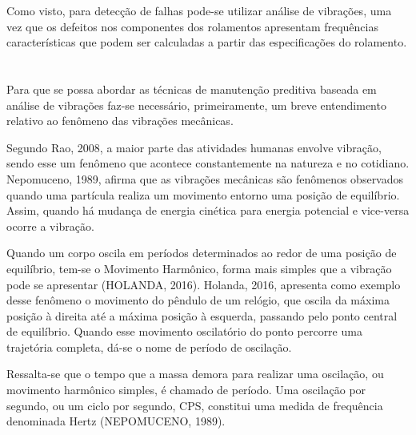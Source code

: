 \documentclass[
	12pt,				
	oneside,			
	a4paper,			
	english,			
	brazil,	
	sumario=abnt-6027-2012		
	]{abntex2ppgsi}
\begin{document}
Como visto, para detecção de falhas pode-se utilizar análise de vibrações, uma vez que os defeitos nos componentes dos rolamentos apresentam frequências características que podem ser calculadas a partir das especificações do rolamento. 

\newpage
\section{}

Para que se possa abordar as técnicas de manutenção preditiva baseada em análise de vibrações faz-se necessário, primeiramente, um breve entendimento relativo ao fenômeno das vibrações mecânicas. 

Segundo Rao, 2008, a maior parte das atividades humanas envolve vibração, sendo esse um fenômeno que acontece constantemente na natureza e no cotidiano. Nepomuceno, 1989, afirma que as vibrações mecânicas são fenômenos observados quando uma partícula realiza um movimento entorno uma posição de equilíbrio. Assim, quando há mudança de energia cinética para energia potencial e vice-versa ocorre a vibração. 

Quando um corpo oscila em períodos determinados ao redor de uma posição de equilíbrio, tem-se o Movimento Harmônico, forma mais simples que a vibração pode se apresentar (HOLANDA, 2016). Holanda, 2016, apresenta como exemplo desse fenômeno o movimento do pêndulo de um relógio, que oscila da máxima posição à direita até a máxima posição à esquerda, passando pelo ponto central de equilíbrio. Quando esse movimento oscilatório do ponto percorre uma trajetória completa, dá-se o nome de período de oscilação.  

Ressalta-se que o tempo que a massa demora para realizar uma oscilação, ou movimento harmônico simples, é chamado de período. Uma oscilação por segundo, ou um ciclo por segundo, CPS, constitui uma medida de frequência denominada Hertz (NEPOMUCENO, 1989). 


\end{document}
